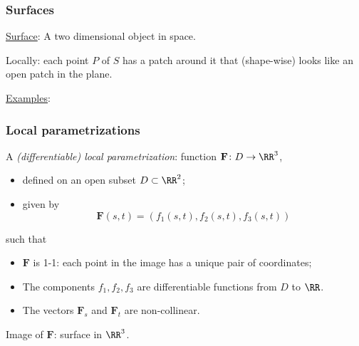 \begin{frame}
  \frametitle{Surfaces}

 \underline{Surface}:  A two dimensional object in space.

\medskip

 Locally: each point $P$ of $S$ has a patch around it that (shape-wise) looks like an open patch in the plane.

\underline{Examples}:
 
\begin{overlayarea}{\textheight}{7cm}

\end{overlayarea}
\end{frame}


\begin{frame}
  \frametitle{Local parametrizations}

  A \emph{(differentiable) local parametrization}:
   function $\textbf{F} \colon D \to \RR^3$,
   \begin{itemize}
     \item defined on an open subset $D \subset \RR^2$;
     \item given by
%
$$\textbf{F}(s,t) = ( f_1(s,t), f_2(s,t), f_3(s,t) )$$
   \end{itemize}
%
such that
%
\begin{itemize}
  \item $\textbf{F}$ is 1-1: each point in the image has a unique pair of coordinates;
  \item The components $f_1, f_2, f_3$ are differentiable functions from $D$ to $\RR$.
  \item The vectors $\textbf{F}_s$ and $\textbf{F}_t$ are non-collinear.
\end{itemize}

\medskip

Image of $\textbf{F}$: surface in $\RR^3$.
\end{frame}

